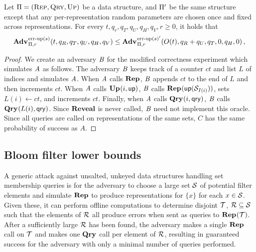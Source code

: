 \begin{lemma}[]\label{lemma:immutabletomutablenew}
  Let $\mathrm{\Pi} = (\textsc{Rep}, \textsc{Qry}, \textsc{Up})$ be a data structure, and $\mathrm{\Pi}'$ be the same structure except that any per-representation random parameters are chosen once and fixed across representations. For every $t, q_r, q_T, q_U, q_H, q_V, r \geq 0$, it holds that
  \[
    \Adv{\errep(s)}_{\struct,r}(t, q_R, q_T, q_U, q_H, q_V) \leq
    \Adv{\errep(s)'}_{\struct,r}(O(t), q_R + q_U, q_T, 0, q_H, 0) \,,
  \]
\end{lemma}
\begin{proof}

We create an adversary $\mathit{B}$ for the modified correctness experiment which simulates $\mathit{A}$ as follows. The adversary $\mathit{B}$ keeps track of a counter $ct$ and list $L$ of indices and simulates $\mathit{A}$. When $\mathit{A}$ calls $\mathbf{Rep}\hspace{0.5pt}$, $\mathit{B}$ appends $ct$ to the end of $L$ and then increments $ct$. When $\mathit{A}$ calls $\mathbf{Up}\hspace{0.5pt}(i,\mathsf{up})$, $\mathit{B}$ calls $\mathbf{Rep}\hspace{0.5pt}(\mathsf{up}(\mathcal{S}_{I(i)}))$, sets $L(i) \gets ct$, and increments $ct$. Finally, when $\mathit{A}$ calls $\mathbf{Qry}\hspace{0.5pt}(i,\mathsf{qry})$, $\mathit{B}$ calls $\mathbf{Qry}\hspace{0.5pt}(L(i),\mathsf{qry})$. Since $\mathbf{Reveal}$ is never called, $\mathit{B}$ need not implement this oracle. Since all queries are called on representations of the same sets, $C$ has the same probability of success as $A$.

\end{proof}

\subsection{Bloom filter lower bounds}
\label{subsec:bloom-filters}



A generic attack against unsalted, unkeyed data structures handling set membership queries is for the adversary to choose a large set $\mathcal{S}$ of potential filter elements and simulate $\mathbf{Rep}\hspace{0.5pt}$ to produce representations for $\{x\}$ for each $x \in \mathcal{S}$. Given these, it can perform offline computations to determine disjoint $\mathcal{T}$, $\mathcal{R} \subseteq \mathcal{S}$ such that the elements of $\mathcal{R}$ all produce errors when sent as queries to $\mathbf{Rep}\hspace{0.5pt}(\mathcal{T})$. After a sufficiently large $\mathcal{R}$ has been found, the adversary makes a single $\mathbf{Rep}\hspace{0.5pt}$ call on $\mathcal{T}$ and makes one $\mathbf{Qry}\hspace{0.5pt}$ call per element of $\mathcal{R}$, resulting in guaranteed success for the adversary with only a minimal number of queries performed.

